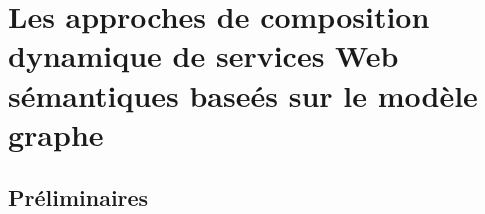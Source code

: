 \chapter{Les approches de composition dynamique de services Web sémantiques baseés sur le modèle graphe}

\newpage
\section{Préliminaires}





